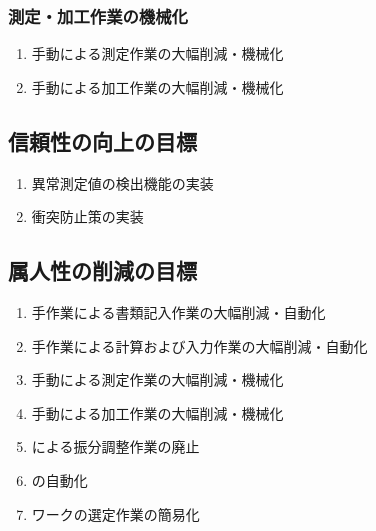 \subsubsection{測定・加工作業の機械化}
\begin{enumerate}[label=\sarrow]
\item 手動による測定作業の大幅削減・機械化
\item 手動による加工作業の大幅削減・機械化
\end{enumerate}


\subsection{信頼性の向上の目標}
\begin{enumerate}[label=\sarrow]
\item 異常測定値の検出機能の実装
\item 衝突防止策の実装
\end{enumerate}


\subsection{属人性の削減の目標}
\begin{enumerate}[label=\sarrow]
\item 手作業による書類記入作業の大幅削減・自動化
\item 手作業による計算および入力作業の大幅削減・自動化
\item 手動による測定作業の大幅削減・機械化
\item 手動による加工作業の大幅削減・機械化
\item \Spacer による振分調整作業の廃止
\item \CurvedOutcutMilling の自動化
\item ワーク\FixtureBolt の選定作業の簡易化
\end{enumerate}



